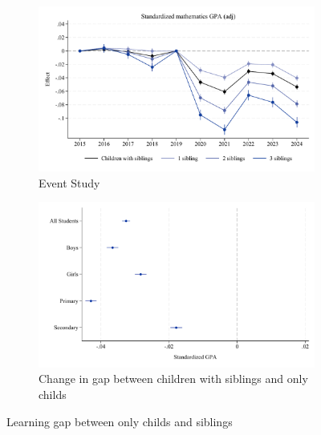 \begin{figure}[htbp]
    \centering
    
    \begin{subfigure}{\textwidth}
        \centering
        \includegraphics[width=\textwidth]{./FIGURES/Event Study/covid_std_gpa_m_adj_all_all_all_elm_all.pdf}
        \caption{Event Study}
        \label{fig:fig2a}
    \end{subfigure}
    
    \vspace{1em} %
    
    \begin{subfigure}{\textwidth}
        \centering
        \includegraphics[width=\textwidth]{./FIGURES/TWFE/covid_twfe_B_all_all_gpa_m_adj_4.pdf}
        \caption{Change in gap between children with siblings and only childs}
        \label{fig:fig2b}
    \end{subfigure}
    
    \caption{Learning gap between only childs and siblings}
    \label{fig:fig2}
\end{figure}


\clearpage
















